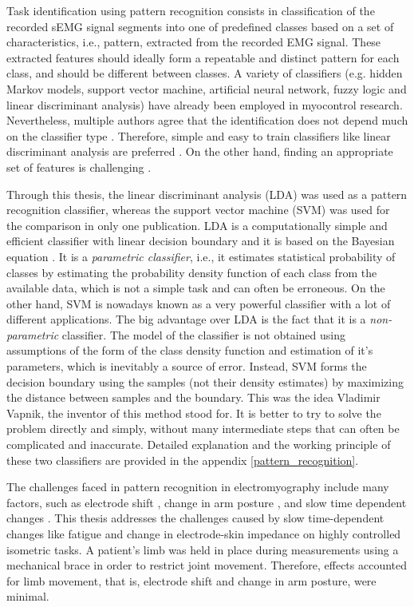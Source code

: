 Task identification using pattern recognition consists in classification of the recorded sEMG signal segments into one of predefined classes based on a set of characteristics, i.e., pattern, extracted from the recorded EMG signal. These extracted features should ideally form a repeatable and distinct pattern for each class, and should be different between classes. A variety of classifiers (e.g. hidden Markov models, support vector machine, artificial neural network, fuzzy logic and linear discriminant analysis) \citep{Oskoei2007} have already been employed in myocontrol research. Nevertheless, multiple authors agree that the identification does not depend much on the classifier type \citep{Hargrove2007, Zhang2012, Hakonen2015}. Therefore, simple and easy to train classifiers like linear discriminant analysis are preferred \citep{Li2010, Englehart1999, Tkach2010, Li2014, Hakonen2015}. On the other hand, finding an appropriate set of features is challenging \citep{Englehart1999, Tkach2010, Liu2013}.

Through this thesis, the linear discriminant analysis (LDA) was used as a pattern recognition classifier, whereas the support vector machine (SVM) was used for the comparison in only one publication. LDA is a computationally simple and efficient classifier with linear decision boundary and it is based on the Bayesian equation \citep{McLachlan2004}. It is a \emph{parametric classifier}, i.e., it estimates statistical probability of classes by estimating the probability density function of each class from the available data, which is not a simple task and can often be erroneous. On the other hand, SVM \citep{Cortes1995} is nowadays known as a very powerful classifier with a lot of different applications. The big advantage over LDA is the fact that it is a \emph{non-parametric} classifier. The model of the classifier is not obtained using assumptions of the form of the class density function and estimation of it's parameters, which is inevitably a source of error. Instead, SVM forms the decision boundary using the samples (not their density estimates) by maximizing the distance between samples and the boundary. This was the idea Vladimir Vapnik, the inventor of this method stood for. It is better to try to solve the problem directly and simply, without many intermediate steps that can often be complicated and inaccurate. Detailed explanation and the working principle of these two classifiers are provided in the appendix \ref{pattern_recognition}.

The challenges faced in pattern recognition in electromyography include many factors, such as electrode shift \citep{Hargrove2008, Young2011}, change in arm posture \citep{Fougner2011}, and slow time dependent changes \citep{Farina2014}. This thesis addresses the challenges caused by slow time-dependent changes like fatigue \citep{Tkach2010} and change in electrode-skin impedance \citep{Clancy2002b} on highly controlled isometric tasks. A patient's limb was held in place during measurements using a mechanical brace in order to restrict joint movement. Therefore, effects accounted for limb movement, that is, electrode shift and change in arm posture, were minimal.  


